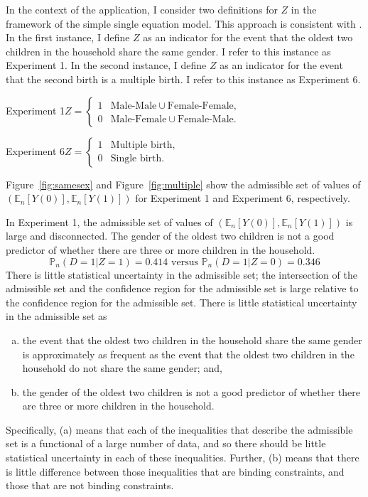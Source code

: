 \documentclass[10pt,a4paper,twoside]{article}
\numberwithin{equation}{section}
\begin{document}
In the context of the application, I consider two definitions for $Z$ in the framework of the simple single equation model. This approach is consistent with \cite{cr13}. In the first instance, I define $Z$ as an indicator for the event that the oldest two children in the household share the same gender. I refer to this instance as Experiment 1. In the second instance, I define $Z$ as an indicator for the event that the second birth is a multiple birth. I refer to this instance as Experiment 6.
 
\noindent Experiment 1\hspace{10pt}$Z=\begin{cases}
1 &\text{Male-Male}\cup\text{Female-Female},\\
0 &\text{Male-Female}\cup\text{Female-Male}.
\end{cases}$

\noindent Experiment 6\hspace{10pt}$Z=\begin{cases}
1 &\text{Multiple birth},\\
0 &\text{Single birth}.
\end{cases}$

\noindent Figure~\ref{fig:samesex} and Figure~\ref{fig:multiple} show the admissible set of values of $(\mathbb{E}_n[Y(0)],\mathbb{E}_n[Y(1)])$ for Experiment 1 and Experiment 6, respectively. 

In Experiment 1, the admissible set of values of $(\mathbb{E}_n[Y(0)],\mathbb{E}_n[Y(1)])$ is large and disconnected. The gender of the oldest two children is not a good predictor of whether there are three or more children in the household. 
\[\mathbb{P}_n(D=1|Z=1)=0.414\text{ versus }\mathbb{P}_n(D=1|Z=0)=0.346\]
There is little statistical uncertainty in the admissible set; the intersection of the admissible set and the confidence region for the admissible set is large relative to the confidence region for the admissible set. There is little statistical uncertainty in the admissible set as
\begin{enumerate}[(a)]
\item the event that the oldest two children in the household share the same gender is approximately as frequent as the event that the oldest two children in the household do not share the same gender; and,
\item the gender of the oldest two children is not a good predictor of whether there are three or more children in the household.
\end{enumerate} 
Specifically, (a) means that each of the inequalities that describe the admissible set is a functional of a large number of data, and so there should be little statistical uncertainty in each of these inequalities. Further, (b) means that there is little difference between those inequalities that are binding constraints, and those that are not binding constraints. 
\end{document}
